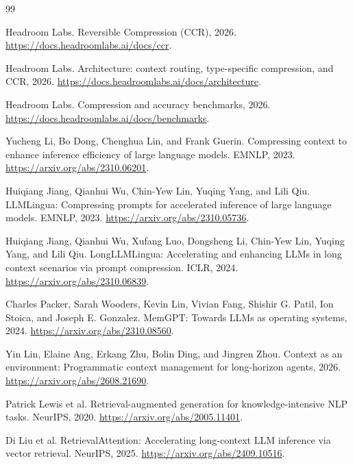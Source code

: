 \documentclass[11pt]{article}
\begin{document}
\begin{thebibliography}{99}

Headroom Labs. Reversible Compression (CCR), 2026.
\url{https://docs.headroomlabs.ai/docs/ccr}.

Headroom Labs. Architecture: context routing, type-specific compression, and
CCR, 2026. \url{https://docs.headroomlabs.ai/docs/architecture}.

Headroom Labs. Compression and accuracy benchmarks, 2026.
\url{https://docs.headroomlabs.ai/docs/benchmarks}.

Yucheng Li, Bo Dong, Chenghua Lin, and Frank Guerin. Compressing context to
enhance inference efficiency of large language models. EMNLP, 2023.
\url{https://arxiv.org/abs/2310.06201}.

Huiqiang Jiang, Qianhui Wu, Chin-Yew Lin, Yuqing Yang, and Lili Qiu.
LLMLingua: Compressing prompts for accelerated inference of large language
models. EMNLP, 2023. \url{https://arxiv.org/abs/2310.05736}.

Huiqiang Jiang, Qianhui Wu, Xufang Luo, Dongsheng Li, Chin-Yew Lin, Yuqing
Yang, and Lili Qiu. LongLLMLingua: Accelerating and enhancing LLMs in long
context scenarios via prompt compression. ICLR, 2024.
\url{https://arxiv.org/abs/2310.06839}.

Charles Packer, Sarah Wooders, Kevin Lin, Vivian Fang, Shishir G. Patil, Ion
Stoica, and Joseph E. Gonzalez. MemGPT: Towards LLMs as operating systems,
2024. \url{https://arxiv.org/abs/2310.08560}.

Yin Lin, Elaine Ang, Erkang Zhu, Bolin Ding, and Jingren Zhou. Context as an
environment: Programmatic context management for long-horizon agents, 2026.
\url{https://arxiv.org/abs/2608.21690}.

Patrick Lewis et al. Retrieval-augmented generation for knowledge-intensive
NLP tasks. NeurIPS, 2020. \url{https://arxiv.org/abs/2005.11401}.

Di Liu et al. RetrievalAttention: Accelerating long-context LLM inference via
vector retrieval. NeurIPS, 2025.
\url{https://arxiv.org/abs/2409.10516}.

\end{thebibliography}
\end{document}
